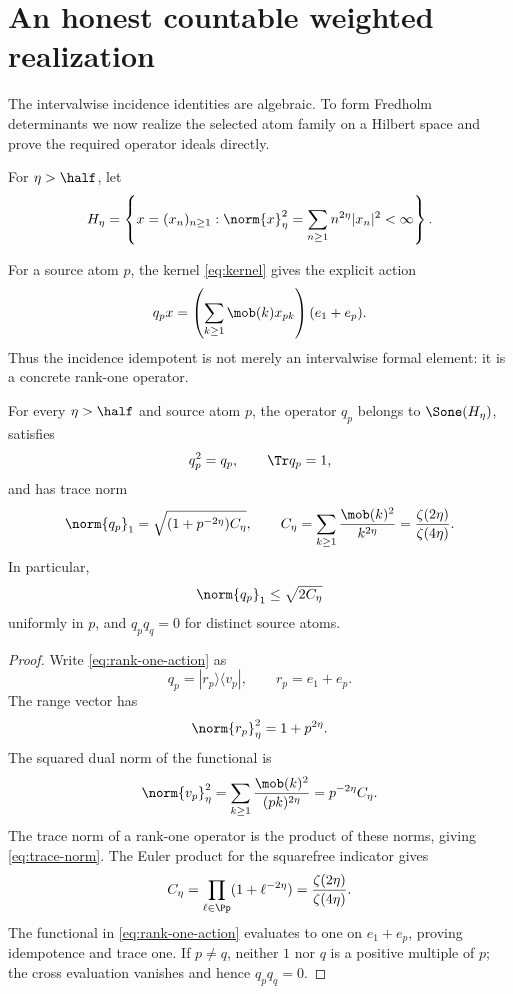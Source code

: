 \section{An honest countable weighted realization}
\label{sec:countable}

The intervalwise incidence identities are algebraic. To form Fredholm
determinants we now realize the selected atom family on a Hilbert space and
prove the required operator ideals directly.

\begin{definition}
\label{def:weighted-space}
For \(\eta>\half\), let
\begin{equation}
H_\eta=
\left\{x=(x_n)_{n\ge1}:
\norm{x}_\eta^2=\sum_{n\ge1}n^{2\eta}|x_n|^2<\infty\right\}.
\label{eq:weighted-space}
\end{equation}
\end{definition}

For a source atom \(p\), the kernel \eqref{eq:kernel} gives the explicit
action
\begin{equation}
q_px
=\left(\sum_{k\ge1}\mob(k)x_{pk}\right)(e_1+e_p).
\label{eq:rank-one-action}
\end{equation}
Thus the incidence idempotent is not merely an intervalwise formal element:
it is a concrete rank-one operator.

\begin{theorem}
\label{thm:rank-one}
For every \(\eta>\half\) and source atom \(p\), the operator \(q_p\) belongs
to \(\Sone(H_\eta)\), satisfies
\[
q_p^2=q_p,\qquad \Tr q_p=1,
\]
and has trace norm
\begin{equation}
\norm{q_p}_1
=\sqrt{(1+p^{-2\eta})C_\eta},
\qquad
C_\eta
=\sum_{k\ge1}\frac{\mob(k)^2}{k^{2\eta}}
=\frac{\zeta(2\eta)}{\zeta(4\eta)}.
\label{eq:trace-norm}
\end{equation}
In particular,
\begin{equation}
\norm{q_p}_1\le\sqrt{2C_\eta}
\label{eq:uniform-trace-norm}
\end{equation}
uniformly in \(p\), and \(q_pq_q=0\) for distinct source atoms.
\end{theorem}

\begin{proof}
Write \eqref{eq:rank-one-action} as
\[
q_p=|r_p\rangle\langle v_p|,
\qquad
r_p=e_1+e_p.
\]
The range vector has
\[
\norm{r_p}_\eta^2=1+p^{2\eta}.
\]
The squared dual norm of the functional is
\[
\norm{v_p}_\eta^2
=\sum_{k\ge1}\frac{\mob(k)^2}{(pk)^{2\eta}}
=p^{-2\eta}C_\eta.
\]
The trace norm of a rank-one operator is the product of these norms, giving
\eqref{eq:trace-norm}. The Euler product for the squarefree indicator gives
\[
C_\eta
=\prod_{\ell\in\Pp}(1+\ell^{-2\eta})
=\frac{\zeta(2\eta)}{\zeta(4\eta)}.
\]
The functional in \eqref{eq:rank-one-action} evaluates to one on
\(e_1+e_p\), proving idempotence and trace one. If \(p\ne q\), neither
\(1\) nor \(q\) is a positive multiple of \(p\); the cross evaluation
vanishes and hence \(q_pq_q=0\).
\end{proof}

